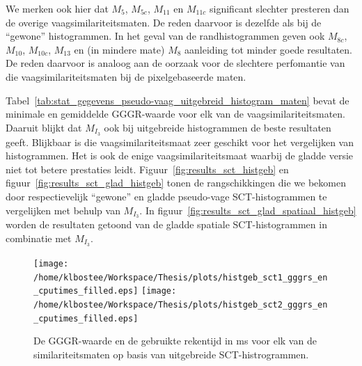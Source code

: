 We merken ook hier dat $M_5$, $M_{5c}$, $M_{11}$ en $M_{11c}$ significant slechter
presteren dan de overige vaagsimilariteitsmaten. De reden daarvoor is dezelfde als bij
de ``gewone'' histogrammen. In het geval van de randhistogrammen geven ook $M_{8c}$, $M_{10}$, 
$M_{10c}$, $M_{13}$ en (in mindere mate) $M_{8}$ aanleiding tot minder goede resultaten.
De reden daarvoor is analoog aan de oorzaak voor de slechtere perfomantie van die 
vaagsimilariteitsmaten bij de pixelgebaseerde maten.

Tabel~\ref{tab:stat_gegevens_pseudo-vaag_uitgebreid_histogram_maten} bevat de minimale
en gemiddelde GGGR-waarde voor elk van de vaagsimilariteitsmaten. Daaruit blijkt dat 
$M_{I_3}$ ook bij uitgebreide histogrammen de beste resultaten geeft. Blijkbaar
is die vaagsimilariteitsmaat zeer geschikt voor het vergelijken van histogrammen. Het
is ook de enige vaagsimilariteitsmaat waarbij de gladde versie niet tot betere 
prestaties leidt. Figuur~\ref{fig:results_sct_histgeb} en 
figuur~\ref{fig:results_sct_glad_histgeb} tonen de rangschikkingen die we bekomen
door respectievelijk ``gewone'' en gladde pseudo-vage SCT-histogrammen te vergelijken
met behulp van $M_{I_3}$. In figuur~\ref{fig:results_sct_glad_spatiaal_histgeb} worden 
de resultaten getoond van de gladde spatiale SCT-histogrammen in combinatie met $M_{I_3}$.

\begin{figure}[bp]
\centering
\texttt{[image: /home/klbostee/Workspace/Thesis/plots/histgeb\_sct1\_gggrs\_en\_cputimes\_filled.eps]} 
\texttt{[image: /home/klbostee/Workspace/Thesis/plots/histgeb\_sct2\_gggrs\_en\_cputimes\_filled.eps]}
\vspace{1pt}
\caption{\label{fig:histgeb_sct_gggrs_en_cputimes}De GGGR-waarde en de gebruikte rekentijd in ms voor elk 
van de similariteitsmaten op basis van uitgebreide SCT-histrogrammen.}
\end{figure}

